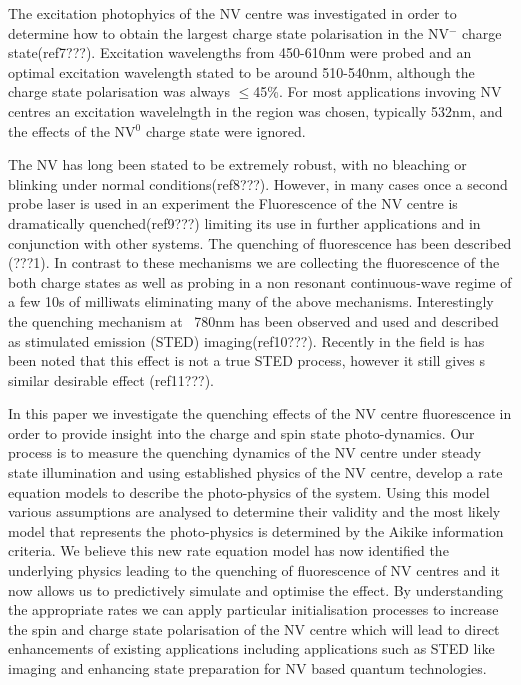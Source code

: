 \documentclass[preprint,prl]{revtex4}
\begin{document}
The excitation photophyics of the NV centre was investigated in order to determine how to obtain the largest charge state polarisation in the NV$^-$ charge state(ref7???). Excitation wavelengths from 450-610nm were probed and an optimal excitation wavelength stated to be around 510-540nm, although the charge state polarisation was always $\leq$45\%. For most applications invoving NV centres an excitation wavelelngth in the region was chosen, typically 532nm, and the effects of the NV$^0$ charge state were ignored.

The NV has long been stated to be extremely robust, with no bleaching or blinking under normal conditions(ref8???). However, in many cases once a second probe laser is used in an experiment the Fluorescence of the NV centre is dramatically quenched(ref9???) limiting its use in further applications and in conjunction with other systems. The quenching of fluorescence has been described (???1). In contrast to these mechanisms we are collecting the fluorescence of the both charge states as well as probing in a non resonant continuous-wave regime of a few 10s of milliwats eliminating many of the above mechanisms. Interestingly the quenching mechanism at ~780nm has been observed and used and described as stimulated emission (STED) imaging(ref10???). Recently in the field is has been noted that this effect is not a true STED process, however it still gives s similar desirable effect (ref11???).  


In this paper we investigate the quenching effects of the NV centre fluorescence in order to provide insight into the charge and spin state photo-dynamics. Our process is to measure the quenching dynamics of the NV centre under steady state illumination and using established physics of the NV centre, develop a rate equation models to describe the photo-physics of the system. Using this model various assumptions are analysed to determine their validity and the most likely model that represents the photo-physics is determined by the Aikike information criteria. We believe this new rate equation model has now identified the underlying physics leading to the quenching of fluorescence of NV centres and it now allows us to predictively simulate and optimise the effect. By understanding the appropriate rates we can apply particular initialisation processes to increase the spin and charge state polarisation of the NV centre which will lead to direct enhancements of existing applications including applications such as STED like imaging and enhancing state preparation for NV based quantum technologies.
\end{document}
